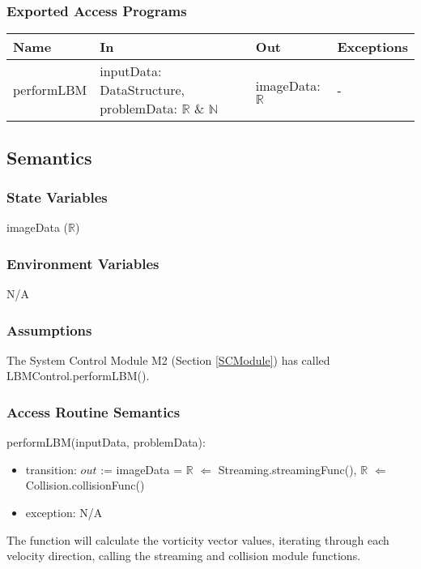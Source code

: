 \documentclass[12pt, titlepage]{article}
\begin{document}
\subsubsection{Exported Access Programs}

\begin{center}
	\begin{tabular}{p{2cm} p{3cm} p{4cm} p{2cm}}
		\hline
		\textbf{Name} & \textbf{In} & \textbf{Out} & \textbf{Exceptions} \\
		\hline
		performLBM & inputData: DataStructure, problemData: $\mathbb{R}$ \& $\mathbb{N}$ & imageData: $\mathbb{R}$ & - \\
		\hline
	\end{tabular}
\end{center}

\subsection{Semantics}

\subsubsection{State Variables}
imageData ($\mathbb{R}$)


\subsubsection{Environment Variables}
N/A

\subsubsection{Assumptions}

The System Control Module M2 (Section \ref{SCModule}) has called LBMControl.performLBM().

\subsubsection{Access Routine Semantics}

\noindent performLBM(inputData, problemData):
\begin{itemize}
	\item transition: $out$ := imageData = $\mathbb{R}$ $\Leftarrow$ Streaming.streamingFunc(), $\mathbb{R}$ $\Leftarrow$ Collision.collisionFunc()
\item exception: N/A
\end{itemize}

The function will calculate the vorticity vector values, iterating through each velocity direction, calling the streaming and collision module functions.
\end{document}
